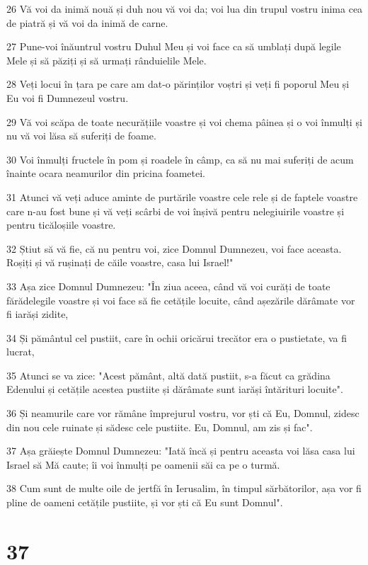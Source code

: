 \par 26 Vă voi da inimă nouă și duh nou vă voi da; voi lua din trupul vostru inima cea de piatră și vă voi da inimă de carne.
\par 27 Pune-voi înăuntrul vostru Duhul Meu și voi face ca să umblați după legile Mele și să păziți și să urmați rânduielile Mele.
\par 28 Veți locui în țara pe care am dat-o părinților voștri și veți fi poporul Meu și Eu voi fi Dumnezeul vostru.
\par 29 Vă voi scăpa de toate necurățiile voastre și voi chema pâinea și o voi înmulți și nu vă voi lăsa să suferiți de foame.
\par 30 Voi înmulți fructele în pom și roadele în câmp, ca să nu mai suferiți de acum înainte ocara neamurilor din pricina foametei.
\par 31 Atunci vă veți aduce aminte de purtările voastre cele rele și de faptele voastre care n-au fost bune și vă veți scârbi de voi înșivă pentru nelegiuirile voastre și pentru ticăloșiile voastre.
\par 32 Știut să vă fie, că nu pentru voi, zice Domnul Dumnezeu, voi face aceasta. Roșiți și vă rușinați de căile voastre, casa lui Israel!"
\par 33 Așa zice Domnul Dumnezeu: "În ziua aceea, când vă voi curăți de toate fărădelegile voastre și voi face să fie cetățile locuite, când așezările dărâmate vor fi iarăși zidite,
\par 34 Și pământul cel pustiit, care în ochii oricărui trecător era o pustietate, va fi lucrat,
\par 35 Atunci se va zice: "Acest pământ, altă dată pustiit, s-a făcut ca grădina Edenului și cetățile acestea pustiite și dărâmate sunt iarăși întărituri locuite".
\par 36 Și neamurile care vor rămâne împrejurul vostru, vor ști că Eu, Domnul, zidesc din nou cele ruinate și sădesc cele pustiite. Eu, Domnul, am zis și fac".
\par 37 Așa grăiește Domnul Dumnezeu: "Iată încă și pentru aceasta voi lăsa casa lui Israel să Mă caute; îi voi înmulți pe oamenii săi ca pe o turmă.
\par 38 Cum sunt de multe oile de jertfă în Ierusalim, în timpul sărbătorilor, așa vor fi pline de oameni cetățile pustiite, și vor ști că Eu sunt Domnul".

\chapter{37}

